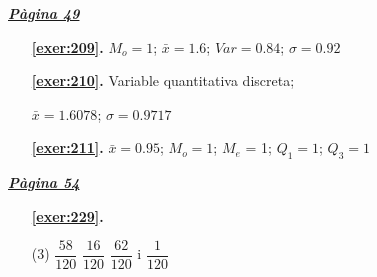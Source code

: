
\hyperlink{page.49}{\textbf{\em Pàgina 49}}
\begin{enumerate}
\item[\fontfamily{phv}\selectfont\color{blue}\textbf{\ref{exer:209}. }] \label{ans:209} 
$M_o =1$; $\bar x=1.6$; $Var=0.84$; $\sigma =0.92$\par {}
 \end{enumerate}
\begin{enumerate}
\item[\fontfamily{phv}\selectfont\color{blue}\textbf{\ref{exer:210}. }] \label{ans:210} 
Variable quantitativa discreta;\par $\bar x=1.6078$; $\sigma =0.9717$\par {}
\item[\fontfamily{phv}\selectfont\color{blue}\textbf{\ref{exer:211}. }] \label{ans:211} 
$\bar x=0.95$; $M_o=1$; $M_e$ = 1; $Q_1 = 1$; $Q_3= 1$ \par {} 
 \end{enumerate}
\vspace{0.3cm}


\hyperlink{page.54}{\textbf{\em Pàgina 54}}
\begin{enumerate}



 \item[\fontfamily{phv}\selectfont\color{blue}\textbf{\ref{exer:229}. }] \label{ans:229}
 \begin{tasks}[column-sep=1em, item-indent=1.3333em](3)
	 \task $\dfrac {58}{120}$
	 \task $\dfrac {16}{120}$
	 \task* $\dfrac {62}{120}$ i $\dfrac {1}{120}$ 
\end{tasks}
 \end{enumerate}
\vspace{0.3cm}


